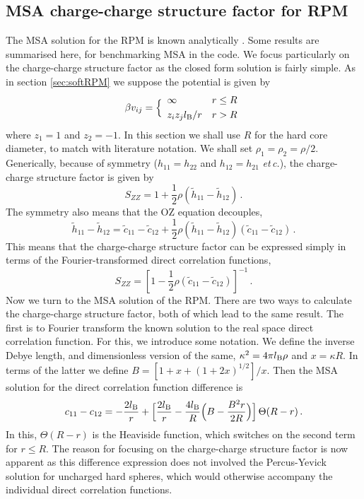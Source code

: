 \documentclass[12pt,a4paper]{article}
\newcommand{\latin}[1]{\emph{#1}}
\newcommand{\etc}{\latin{et\,c.}}
\begin{document}
\subsection{MSA charge-charge structure factor for RPM}
%
The MSA solution for the RPM is known analytically \cite{WL72}.  Some results are
summarised here, for benchmarking MSA in the code.  We focus
particularly on the charge-charge structure factor as the closed form
solution is fairly simple.  As in section \ref{sec:softRPM} we suppose
the potential is given by
%
\begin{equation}
  \beta v_{ij}=\Bigl\{\begin{array}{ll}
  \infty & r\le R\\[3pt]
  z_iz_jl_{\mathrm{B}}/r & r>R
  \end{array}
\end{equation}
%
where $z_1=1$ and $z_2=-1$. In this section we shall use $R$ for the
hard core diameter, to match with literature notation.  We shall set
$\rho_1=\rho_2=\rho/2$.  Generically, because of symmetry
($h_{11}=h_{22}$ and $h_{12}=h_{21}$ \etc), the charge-charge
structure factor is given by
%
\begin{equation}
  S_{ZZ}=1+{\textstyle\frac{1}{2}}\rho(\tilde h_{11}-\tilde h_{12})\,.
\end{equation}
%
The symmetry also means that the OZ equation decouples,
%
\begin{equation}
  \tilde h_{11}-\tilde h_{12}=
  \tilde c_{11}-\tilde c_{12} + 
  {\textstyle\frac{1}{2}}\rho(\tilde h_{11}-\tilde h_{12})
  (\tilde c_{11}-\tilde c_{12})\,.
\end{equation}
%
This means that the charge-charge structure factor can be expressed
simply in terms of the Fourier-transformed direct correlation functions,
%
\begin{equation}
  S_{ZZ}=[1-{\textstyle\frac{1}{2}}\rho(\tilde c_{11}-\tilde c_{12})]^{-1}\,.
\end{equation}
%
Now we turn to the MSA solution of the RPM.  There are two ways to
calculate the charge-charge structure factor, both of which lead to
the same result.  The first is to Fourier transform the known solution
to the real space direct correlation function.  For this, we introduce
some notation.  We define the inverse Debye length, and dimensionless
version of the same, $\kappa^2=4\pi l_{\mathrm{B}}\rho$ and $x=\kappa R$.  In
terms of the latter we define $B=[1+x+(1+2x)^{1/2}]/x$.  Then the MSA
solution for the direct correlation function difference is \cite{WL72}
%
\begin{equation}
  c_{11}-c_{12}=-\frac{2l_{\mathrm{B}}}{r}+\Bigl[\frac{2l_{\mathrm{B}}}{r}
  -\frac{4l_{\mathrm{B}}}{R}\Bigl(B-\frac{B^2 r}{2R}\Bigr)\Bigr]\,\Theta(R-r)\,.
\end{equation}
%
In this, $\Theta(R-r)$ is the Heaviside function, which switches
on the second term for  $r\le R$.  The reason for focusing on the
charge-charge structure factor is now apparent as this difference
expression does not involved the Percus-Yevick solution for uncharged
hard spheres, which would otherwise accompany the individual direct
correlation functions.
\end{document}
